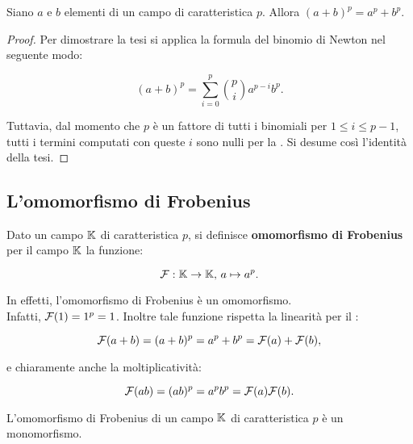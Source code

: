 \begin{theorem}
    \label{th:binomio_ingenuo}
    Siano $a$ e $b$ elementi di un campo di caratteristica $p$. Allora
    $(a+b)^p = a^p + b^p$.
\end{theorem}

\begin{proof}
    Per dimostrare la tesi si applica la formula del binomio di Newton
    nel seguente modo:

    \[ (a+b)^p = \sum_{i=0}^p \binom{p}{i} a^{p-i}b^p. \]

    \vskip 0.1in

    Tuttavia, dal momento che $p$ è un fattore di tutti i binomiali per
    $1 \leq i \leq p-1$, tutti i termini computati con queste $i$
    sono nulli per la .
    Si desume così l'identità della tesi.
\end{proof}

\subsection{L'omomorfismo di Frobenius}

\begin{definition}
    Dato un campo $\mathbb{K}$ di caratteristica $p$, si definisce
    \textbf{omomorfismo di Frobenius} per il campo $\mathbb{K}$
    la funzione:

    \[ \mathcal{F} : \mathbb{K} \to \mathbb{K},\, a \mapsto a^p. \]
\end{definition}

\begin{remark*}
    In effetti, l'omomorfismo di Frobenius è un omomorfismo. \\

    Infatti, $\mathcal{F}(1) = 1^p = 1$. Inoltre tale funzione
    rispetta la linearità per il :

    \[ \mathcal{F}(a + b) = (a+b)^p = a^p + b^p = \mathcal{F}(a) + \mathcal{F}(b), \]

    \vskip 0.1in

    e chiaramente anche la moltiplicatività:

    \[ \mathcal{F}(ab) = (ab)^p = a^p b^p = \mathcal{F}(a) \mathcal{F}(b). \]
\end{remark*}

\begin{proposition}
    \label{prop:frobenius_monomorfismo}
    L'omomorfismo di Frobenius di un campo $\mathbb{K}$ di caratteristica
    $p$ è un monomorfismo.
\end{proposition}

